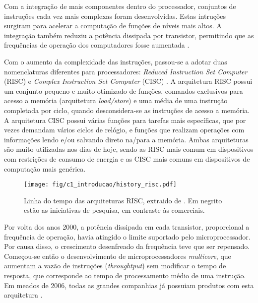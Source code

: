 \documentclass[11pt,a4paper,oneside]{book}
\begin{document}
Com a integra\c{c}\~ao de mais componentes dentro do processador, conjuntos de instru\c{c}\~oes cada vez mais complexas foram desenvolvidas.
Estas intru\c{c}\~oes surgiram para acelerar a computa\c{c}\~ao de fun\c{c}\~oes de n\'iveis mais altos.
A integra\c{c}\~ao tamb\'em reduziu a pot\^encia dissipada por transistor, permitindo que as frequ\^encias de opera\c{c}\~ao dos computadores fosse aumentada \cite{Hennessy2011}.

Com o aumento da complexidade das instruções, passou-se a adotar duas nomenclaturas diferentes para processadores: \textit{Reduced Instruction Set Computer} (RISC) e \textit{Complex Instruction Set Computer} (CISC) \cite{Fedeli2003}.
A arquitetura RISC possui um conjunto pequeno e muito otimizado de funções, comandos exclusivos para acesso a memória (arquitetura \textit{load/store}) e uma média de uma instrução completada por ciclo, quando desconsidera-se as instruções de acesso a memória.
A arquitetura CISC possui várias funções para tarefas mais específicas, que por vezes demandam vários ciclos de relógio, e funções que realizam operações com informações lendo e/ou salvando direto na/para a memória.
Ambas arquiteturas são muito utilizadas nos dias de hoje, sendo as RISC mais comum em dispositivos com restrições de consumo de energia e as CISC mais comuns em dispositivos de computação mais genérica.


\begin{figure}[h]
\centering
\texttt{[image: fig/c1\_introducao/history\_risc.pdf]}
\caption{Linha do tempo das arquiteturas RISC, extraido de \cite{Hennessy2011}. Em negrito estão as iniciativas de pesquisa, em contraste às comerciais.}
\label{fig:history_risc}
\end{figure}

Por volta dos anos 2000, a pot\^encia dissipada em cada transistor, proporcional a frequência de opera\c{c}\~ao, havia atingido o limite suportado pelo microprocessador.
Por causa disso, o crescimento desenfreado da frequ\^encia teve que ser repensado.
Come\c{c}ou-se ent\~ao o desenvolvimento de microprocessadores \textit{multicore}, que aumentam a vaz\~ao de instru\c{c}\~oes (\textit{throughtput}) sem modificar o tempo de resposta, que corresponde ao tempo de processamento médio de uma instrução.
Em meados de 2006, todas as grandes companhias j\'a possuiam produtos com esta arquitetura \cite{Hennessy2011}.
\end{document}
